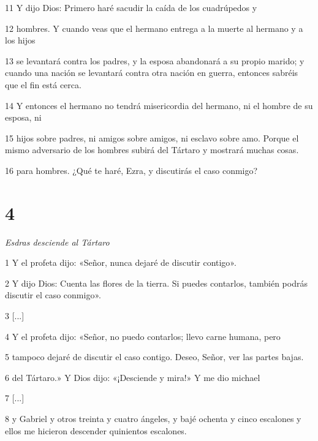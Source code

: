 \par 11 Y dijo Dios: Primero haré sacudir la caída de los cuadrúpedos y

\par 12 hombres. Y cuando veas que el hermano entrega a la muerte al hermano y a los hijos

\par 13 se levantará contra los padres, y la esposa abandonará a su propio marido; y cuando una nación se levantará contra otra nación en guerra, entonces sabréis que el fin está cerca.

\par 14 Y entonces el hermano no tendrá misericordia del hermano, ni el hombre de su esposa, ni

\par 15 hijos sobre padres, ni amigos sobre amigos, ni esclavo sobre amo. Porque el mismo adversario de los hombres subirá del Tártaro y mostrará muchas cosas.

\par 16 para hombres. ¿Qué te haré, Ezra, y discutirás el caso conmigo?

\chapter{4}

\par \textit{Esdras desciende al Tártaro}

\par 1 Y el profeta dijo: «Señor, nunca dejaré de discutir contigo».

\par 2 Y dijo Dios: Cuenta las flores de la tierra. Si puedes contarlos, también podrás discutir el caso conmigo».

\par 3 [...]

\par 4 Y el profeta dijo: «Señor, no puedo contarlos; llevo carne humana, pero

\par 5 tampoco dejaré de discutir el caso contigo. Deseo, Señor, ver las partes bajas.

\par 6 del Tártaro.» Y Dios dijo: «¡Desciende y mira!» Y me dio michael

\par 7 [...]

\par 8 y Gabriel y otros treinta y cuatro ángeles, y bajé ochenta y cinco escalones y ellos me hicieron descender quinientos escalones.

